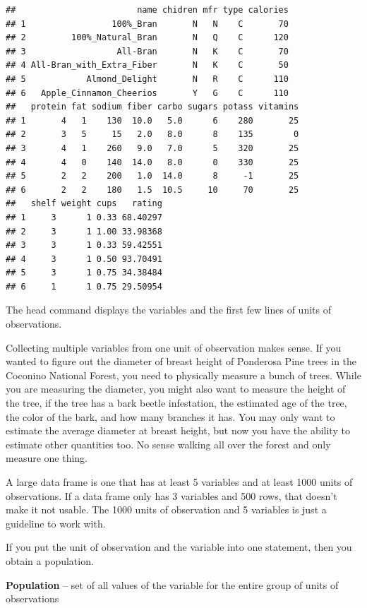 \documentclass[
]{book}
\begin{document}
\begin{verbatim}
##                        name chidren mfr type calories
## 1                 100%_Bran       N   N    C       70
## 2         100%_Natural_Bran       N   Q    C      120
## 3                  All-Bran       N   K    C       70
## 4 All-Bran_with_Extra_Fiber       N   K    C       50
## 5            Almond_Delight       N   R    C      110
## 6   Apple_Cinnamon_Cheerios       Y   G    C      110
##   protein fat sodium fiber carbo sugars potass vitamins
## 1       4   1    130  10.0   5.0      6    280       25
## 2       3   5     15   2.0   8.0      8    135        0
## 3       4   1    260   9.0   7.0      5    320       25
## 4       4   0    140  14.0   8.0      0    330       25
## 5       2   2    200   1.0  14.0      8     -1       25
## 6       2   2    180   1.5  10.5     10     70       25
##   shelf weight cups   rating
## 1     3      1 0.33 68.40297
## 2     3      1 1.00 33.98368
## 3     3      1 0.33 59.42551
## 4     3      1 0.50 93.70491
## 5     3      1 0.75 34.38484
## 6     1      1 0.75 29.50954
\end{verbatim}

The head command displays the variables and the first few lines of units of observations.

Collecting multiple variables from one unit of observation makes sense. If you wanted to figure out the diameter of breast height of Ponderosa Pine trees in the Coconino National Forest, you need to physically measure a bunch of trees. While you are measuring the diameter, you might also want to measure the height of the tree, if the tree has a bark beetle infestation, the estimated age of the tree, the color of the bark, and how many branches it has. You may only want to estimate the average diameter at breast height, but now you have the ability to estimate other quantities too. No sense walking all over the forest and only measure one thing.

A large data frame is one that has at least 5 variables and at least 1000 units of observations. If a data frame only has 3 variables and 500 rows, that doesn't make it not usable. The 1000 units of observation and 5 variables is just a guideline to work with.

If you put the unit of observation and the variable into one statement, then you obtain a population.

\textbf{Population} -- set of all values of the variable for the entire group of units of observations
\end{document}
